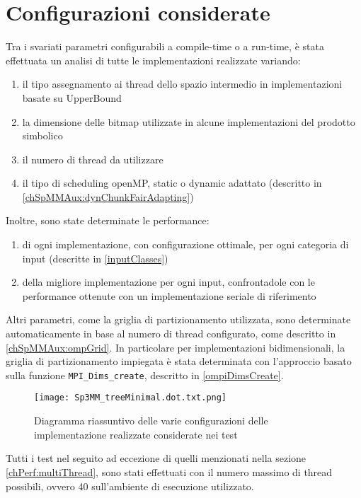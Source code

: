 \section{Configurazioni considerate}
Tra i svariati parametri configurabili a compile-time o a run-time, è stata effettuata 
un analisi di tutte le implementazioni realizzate variando:
\begin{enumerate}
	\item	il tipo assegnamento ai thread dello spazio intermedio in implementazioni basate su UpperBound 
	\item	la dimensione delle bitmap utilizzate in alcune implementazioni del prodotto simbolico %
	\item	il numero di thread da utilizzare 
	\item	il tipo di scheduling openMP, static o dynamic adattato (descritto in \ref{chSpMMAux:dynChunkFairAdapting})
	\setcounter{queriesCounter}{\value{enumi}}
\end{enumerate}
Inoltre, sono state determinate le performance:
\begin{enumerate}
	\setcounter{queriesCounter}{\value{enumi}}
	\item	di ogni implementazione, con configurazione ottimale, per ogni categoria di input (descritte in \ref{inputClasses})
	\item	della migliore implementazione per ogni input, confrontadole con le performance ottenute con un implementazione seriale di riferimento
\end{enumerate}
Altri parametri, come la griglia di partizionamento utilizzata, sono determinate automaticamente in base al numero di thread configurato,
come descritto in \ref{chSpMMAux:ompGrid}.
In particolare per implementazioni bidimensionali, la griglia di partizionamento impiegata è stata determinata con l'approccio
basato sulla funzione \verb|MPI_Dims_create|, descritto in \ref{ompiDimsCreate}.\\
\begin{figure}[H]
  \centering \texttt{[image: Sp3MM\_treeMinimal.dot.txt.png]}
  \caption{Diagramma riassuntivo delle varie configurazioni delle implementazione realizzate considerate nei test}
  \decoRule \label{fig:q1}
\end{figure}
\voidLine
Tutti i test nel seguito ad eccezione di quelli menzionati nella sezione \ref{chPerf:multiThread}, sono stati effettuati 
con il numero massimo di thread possibili, ovvero 40 sull'ambiente di esecuzione utilizzato.\\


